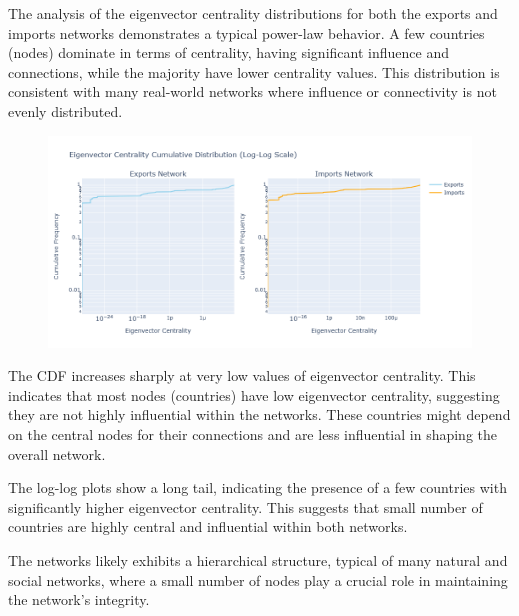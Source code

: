 \documentclass[12pt, a4paper]{article}
\begin{document}
The analysis of the eigenvector centrality distributions for both the exports and imports networks demonstrates a typical power-law behavior. A few countries (nodes) dominate in terms of centrality, having significant influence and connections, while the majority have lower centrality values. This distribution is consistent with many real-world networks where influence or connectivity is not evenly distributed.
\begin{figure}[ht]
\centering
\includegraphics[scale=0.4]{img/eigencum.png}
\label{fig:eigencum}
\end{figure}
The CDF increases sharply at very low values of eigenvector centrality. This indicates that most nodes (countries) have low eigenvector centrality, suggesting they are not highly influential within the networks. These countries might depend on the central nodes for their connections and are less influential in shaping the overall network.

The log-log plots show a long tail, indicating the presence of a few countries with significantly higher eigenvector centrality. This suggests that small number of countries are highly central and influential within both networks.

The networks likely exhibits a hierarchical structure, typical of many natural and social networks, where a small number of nodes play a crucial role in maintaining the network's integrity.
\end{document}
